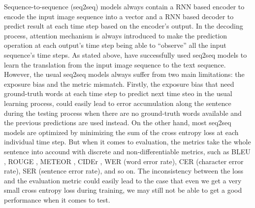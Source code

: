 \documentclass[a4paper, 10pt, conference]{ieeeconf}      %
\begin{document}
Sequence-to-sequence (seq2seq) models always contain a RNN based encoder to encode the input image sequence into a vector and a RNN based decoder to predict result at each time step based on the encoder's output. In the decoding process, attention mechanism is always introduced to make the prediction operation at each output's time step being able to ``observe'' all the input sequence's time steps. As stated above, \cite{Chung, Chung2017, Afouras2018} have successfully used seq2seq models to learn the translation from the input image sequence to the text sequence. 
However, the usual seq2seq models always suffer from two main limitations: the exposure bias and the metric mismatch. Firstly, the exposure bias that need ground-truth words at each time step to predict next time steo in the usual learning process, could easily lead to error accumulation along the sentence during the testing process when there are no ground-truth words available and the previous predictions are used instead.
On the other hand, most seq2seq models are optimized by minimizing the sum of the cross entropy loss at each individual time step. But when it comes to evaluation, the metrics take the whole sentence into accound with discrete and non-differentiable metrics, such as BLEU \cite{Papineni2002}, ROUGE \cite{Lin2001}, METEOR \cite{Banerjee2003}, CIDEr \cite{Tech}, WER (word error rate), CER (character error rate), SER (sentence error rate), and so on. The inconsistency between the loss and the evaluation metric could easily lead to the case that even we get a very small cross entropy loss during training, we may still not be able to get a good performance when it comes to test. %
\end{document}
